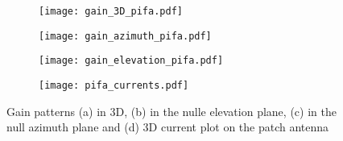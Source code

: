\documentclass[12pt,a4paper]{article}
\begin{document}
{	\begin{figure}[h]
		\begin{center}
			\begin{subfigure}{0.5\linewidth}
				\texttt{[image: gain\_3D\_pifa.pdf]}
				\caption{}
			\end{subfigure}
			\begin{subfigure}{0.5\linewidth}
				\texttt{[image: gain\_azimuth\_pifa.pdf]}
				\caption{}	\end{subfigure}
			\begin{subfigure}{0.5\linewidth}
				\texttt{[image: gain\_elevation\_pifa.pdf]}
				\caption{}	\end{subfigure}
			\begin{subfigure}{0.5\linewidth}
				\texttt{[image: pifa\_currents.pdf]}
				\caption{} \end{subfigure}
			\caption{\selectfont
				\color{gray}
				Gain patterns (a) in 3D, (b) in the nulle elevation plane, (c) in the null azimuth plane and (d) 3D current plot on the patch antenna }
		\end{center}  
	\end{figure}
}
\end{document}
